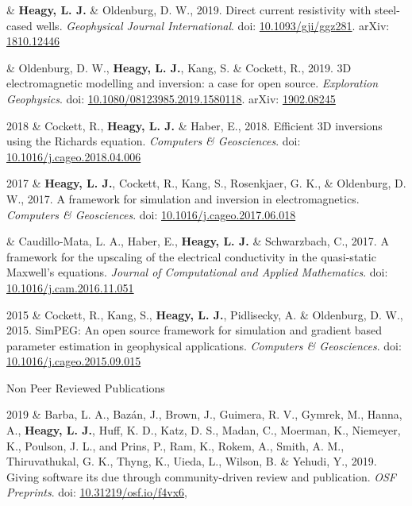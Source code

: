 \documentclass[a4paper, 11pt]{article}
\newcommand{\arxiv}[1]{arXiv: \href{https://arxiv.org/abs/#1}{#1}}
\newcommand{\doi}[1]{doi: \href{https://doi.org/#1}{#1}}
\newcommand{\subheading}[1]{
    \vspace{0.4cm}
    {\Large #1}\\
    \vspace{-0.2cm}
}
\begin{document}
\begin{entryright}
& \textbf{Heagy, L. J.} \& Oldenburg, D. W., 2019. Direct current resistivity with steel-cased wells. \emph{Geophysical Journal International}. \doi{10.1093/gji/ggz281}. \arxiv{1810.12446}
\end{entryright}

\begin{entryright}
& Oldenburg, D. W., \textbf{Heagy, L. J.}, Kang, S. \& Cockett, R., 2019. 3D electromagnetic modelling and inversion: a case for open source. \emph{Exploration Geophysics}. \doi{10.1080/08123985.2019.1580118}. \arxiv{1902.08245}
\end{entryright}

\begin{entryright}
2018 & Cockett, R., \textbf{Heagy, L. J.} \& Haber, E., 2018. Efficient 3D inversions using the Richards equation. \emph{Computers \& Geosciences}. \doi{10.1016/j.cageo.2018.04.006}
\end{entryright}

\begin{entryright}
2017 & \textbf{Heagy, L. J.}, Cockett, R., Kang, S., Rosenkjaer, G. K., \& Oldenburg, D. W., 2017. A framework for simulation and inversion in electromagnetics. \emph{Computers \& Geosciences}. \doi{10.1016/j.cageo.2017.06.018}
\end{entryright}

\begin{entryright}
    & Caudillo-Mata, L. A., Haber, E., \textbf{Heagy, L. J.} \& Schwarzbach, C., 2017. A framework for the upscaling of the electrical conductivity in the quasi-static Maxwell's equations. \emph{Journal of Computational and Applied Mathematics}. \doi{10.1016/j.cam.2016.11.051}
\end{entryright}

\begin{entryright}
2015 & Cockett, R., Kang, S., \textbf{Heagy, L. J.}, Pidlisecky, A. \& Oldenburg, D. W., 2015. SimPEG: An open source framework for simulation and gradient based parameter estimation in geophysical applications. \emph{Computers \& Geosciences}. \doi{10.1016/j.cageo.2015.09.015}
\end{entryright}


\subheading{Non Peer Reviewed Publications}

\begin{entryright}
2019 & Barba, L. A., Baz\'an, J., Brown, J., Guimera, R. V., Gymrek, M., Hanna, A., \textbf{Heagy, L. J.}, Huff, K. D., Katz, D. S., Madan, C., Moerman, K., Niemeyer, K., Poulson, J. L., and Prins, P., Ram, K., Rokem, A., Smith, A. M., Thiruvathukal, G. K., Thyng, K., Uieda, L., Wilson, B. \& Yehudi, Y.,
2019. Giving software its due through community-driven review and publication. \emph{OSF Preprints}. \doi{10.31219/osf.io/f4vx6},
\end{entryright}
\end{document}
